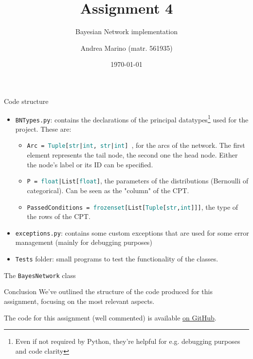\documentclass[10pt,xcolor={table,dvipsnames}]{beamer} 		%
\title[ISPR - 4th Assignment]{Assignment 4}
\subtitle{Bayesian Network implementation}
\author[Andrea Marino]{Andrea Marino \small{(matr. 561935)}}
\institute[DI UniPi]{Università di Pisa, dipartimento di Informatica}
\date{\today}
\theoremstyle{plain}					%
\theoremstyle{definition}
\theoremstyle{remark}
\newcommand{\teal}[1]{\textcolor{teal}{#1}}
\newcommand{\plb}[1]{\textcolor{pythonlb}{#1}}
\begin{document}
	\begin{frame}[plain]
		\titlepage
	\end{frame}

	\begin{frame}{Code structure}

		\begin{itemize}
			\item<3-> \texttt{BNTypes.py}: contains the declarations of the principal 
			datatypes\footnote{Even if not required by Python,
			they're helpful for e.g. debugging purposes and code clarity} used for the project. These are:
			\begin{itemize}
				\item<4-> \texttt{\plb{Arc} =
					\teal{Tuple}[\teal{str}|\teal{int},
					\teal{str}|\teal{int}]
					}, for the arcs of the network. 
					The first element represents the tail node, 
					the second one the head node. 
					Either the node's label or its ID can be specified.  
				\item<5-> \texttt{\plb{P} = \teal{float}|\plb{List}[\teal{float}]}, 
				the parameters of the distributions (Bernoulli of categorical). 
				Can be seen as the "column" of the CPT.
				\item<6-> \texttt{\plb{PassedConditions} = \teal{frozenset}[\plb{List}[\teal{Tuple}[\teal{str},\teal{int}]]]}, 
				the type of the rows of the CPT. 
			\end{itemize}
			\item<8-> \texttt{exceptions.py}: contains some custom exceptions that are 
			used for some error management (mainly for debugging purposes)
			\item<9-> \texttt{Tests} folder: small programs to test the functionality
			of the classes.
		\end{itemize}
	\end{frame}

	\begin{frame}{The \texttt{BayesNetwork} class}{}
		
	\end{frame}


    
    \begin{frame}{Conclusion}
        We've outlined the structure of the code produced for this assignment, 
		focusing on the most relevant aspects. 
		\bigskip 


		The code for this assignment (well commented) is available
		\href{https://github.com/M4rinz/ISPR-Assignments}{on GitHub}.
    \end{frame}
\end{document}
